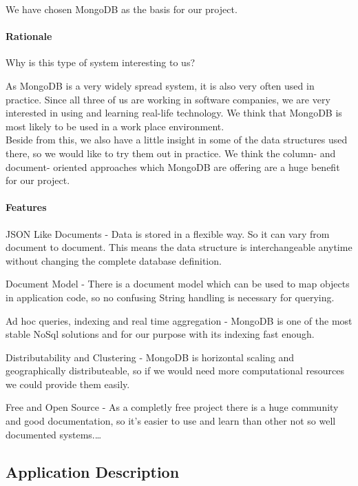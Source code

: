 We have chosen MongoDB as the basis for our project.

\paragraph{Rationale} Why is this type of system interesting to us? 

As MongoDB is a very widely spread system, it is also very often used in practice. Since all three of us are working in software companies, we are very interested in using and learning real-life technology. We think that MongoDB is most likely to be used in a work place environment. \\ 

Beside from this, we also have a little insight in some of the data structures used there, so we would like to try them out in practice. We think the column- and document- oriented approaches which MongoDB are offering are a huge benefit for our project.

\paragraph{Features} 

\begin{packed_enum}
    \item JSON Like Documents - Data is stored in a flexible way. So it can vary from document to document. This means the data structure is interchangeable anytime without changing the complete database definition.
    \item Document Model - There is a document model which can be used to map objects in application code, so no confusing String handling is necessary for querying.
    \item Ad hoc queries, indexing and real time aggregation - MongoDB is one of the most stable NoSql solutions and for our purpose with its indexing fast enough.
    \item Distributability and Clustering - MongoDB is horizontal scaling and geographically distributeable, so if we would need more computational resources we could provide them easily. 
    \item Free and Open Source - As a completly free project there is a huge community and good documentation, so it's easier to use and learn than other not so well documented systems.\ldots
\end{packed_enum}

\subsection{Application Description}

